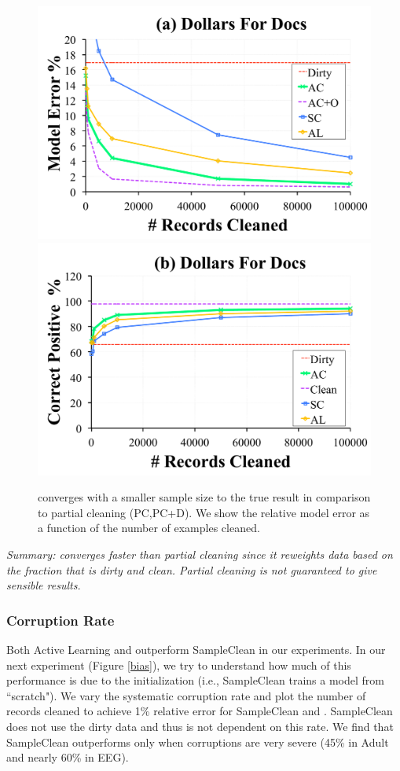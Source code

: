 \begin{figure}[ht!]
\centering
 \includegraphics[width=0.49\columnwidth]{exp/exp14a.pdf}
    \includegraphics[width=0.49\columnwidth]{exp/exp14b.pdf}
 \caption{\sys converges with a smaller sample size to the true result in comparison to partial cleaning (PC,PC+D). We show the relative model error as a function of the number of examples cleaned. \label{pc-perf}}
\end{figure}

\noindent \emph{Summary: \sys converges faster than partial cleaning since it reweights data based on the fraction that is dirty and clean. Partial cleaning is not guaranteed to give sensible results.}

\subsubsection{Corruption Rate}
Both Active Learning and \sys outperform SampleClean in our experiments.
In our next experiment (Figure \ref{bias}), we try to understand how much of this performance 
is due to the initialization (i.e., SampleClean trains a model from ``scratch").
We vary the systematic corruption rate and plot the number of records cleaned to achieve 1\% relative error for SampleClean and \sys.
SampleClean does not use the dirty data and thus is not dependent on this rate.
We find that SampleClean outperforms \sys only when corruptions are very severe (45\% in Adult and nearly 60\% in EEG). 

\vspace{0.25em}

